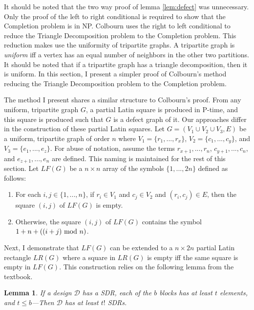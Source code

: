 \documentclass[12pt]{article}
\newtheorem{lemma}[theorem]{Lemma}
\theoremstyle{definition}
\theoremstyle{remark}
\begin{document}
It should be noted that the two way proof of lemma \ref{lem:defect} was unnecessary. Only the proof of the left to right conditional is required to show that the Completion problem is in NP. Colbourn\cite{colbourn} uses the right to left conditional to reduce the Triangle Decomposition problem to the Completion problem. This reduction makes use the uniformity of tripartite graphs. A tripartite graph is \textit{uniform} iff a vertex has an equal number of neighbors in the other two partitions. It should be noted that if a tripartite graph has a triangle decomposition, then it is uniform. In this section, I present a simpler proof of Colbourn's method reducing the Triangle Decomposition problem to the Completion problem.

The method I present shares a similar structure to Colbourn's proof. From any uniform, tripartite graph $G$, a partial Latin square is produced in P-time, and this square is produced such that $G$ is a defect graph of it. Our approaches differ in the construction of these partial Latin squares. Let $G=(V_1 \cup V_2 \cup V_3, E)$ be a uniform, tripartite graph of order $n$ where $V_1 = \{ r_1, ..., r_x \}$, $V_2 = \{ c_1, ..., c_y \}$, and $V_3 = \{ e_1, ..., e_z \}$. For abuse of notation, assume the terms $r_{x+1}, ..., r_n$, $c_{y+1}, ..., c_n$, and $e_{z+1}, ..., e_n$ are defined. This naming is maintained for the rest of this section. Let $LF(G)$ be a $n \times n$ array of the symbols $\{ 1, ..., 2n \}$ defined as follows:

\begin{enumerate}
	\item For each $i,j \in \{1, ..., n\}$, if $r_i \in V_1$ and $c_j \in V_2$ and $(r_i, c_j) \in E$, then the square $(i, j)$ of $LF(G)$ is empty.
	\item Otherwise, the square $(i, j)$ of $LF(G)$ contains the symbol $1 + n + ((i + j) \textnormal{ mod } n)$.
\end{enumerate}

Next, I demonstrate that $LF(G)$ can be extended to a $n \times 2n$ partial Latin rectangle $LR(G)$ where a square in $LR(G)$ is empty iff the same square is empty in $LF(G)$. This construction relies on the following lemma from the textbook.

\begin{lemma}
If a design $\mathscr{D}$ has a SDR, each of the $b$ blocks has at least $t$ elements, and $t \leq b$---Then $\mathscr{D}$ has at least $t!$ SDRs.
\end{lemma}
\end{document}
